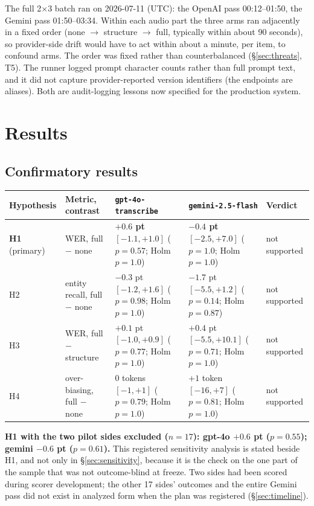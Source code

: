 \documentclass[11pt]{article}
\begin{document}
The full 2$\times$3 batch ran on 2026-07-11 (UTC): the OpenAI pass 00:12--01:50, the Gemini pass 01:50--03:34. Within each audio part the three arms ran adjacently in a fixed order (none $\rightarrow$ structure $\rightarrow$ full, typically within about 90 seconds), so provider-side drift would have to act within about a minute, per item, to confound arms. The order was fixed rather than counterbalanced (\S\ref{sec:threats}, T5). The runner logged prompt character counts rather than full prompt text, and it did not capture provider-reported version identifiers (the endpoints are aliases). Both are audit-logging lessons now specified for the production system.

\section{Results}
\label{sec:results}

\subsection{Confirmatory results}

\begin{center}
\begin{tabular}{@{}l p{2.5cm} p{4.3cm} p{4.3cm} l@{}}
\toprule
Hypothesis & Metric, contrast & \texttt{gpt-4o-transcribe} & \texttt{gemini-2.5-flash} & Verdict \\
\midrule
\textbf{H1} (primary) & WER, full $-$ none & \textbf{$+0.6$ pt} $[-1.1, +1.0]$ ($p = 0.57$; Holm $p = 1.0$) & \textbf{$-0.4$ pt} $[-2.5, +7.0]$ ($p = 1.0$; Holm $p = 1.0$) & not supported \\
\addlinespace
H2 & entity recall, full $-$ none & $-0.3$ pt $[-1.2, +1.6]$ ($p = 0.98$; Holm $p = 1.0$) & $-1.7$ pt $[-5.5, +1.2]$ ($p = 0.14$; Holm $p = 0.87$) & not supported \\
\addlinespace
H3 & WER, full $-$ structure & $+0.1$ pt $[-1.0, +0.9]$ ($p = 0.77$; Holm $p = 1.0$) & $+0.4$ pt $[-5.5, +10.1]$ ($p = 0.71$; Holm $p = 1.0$) & not supported \\
\addlinespace
H4 & over-biasing, full $-$ none & 0 tokens $[-1, +1]$ ($p = 0.79$; Holm $p = 1.0$) & $+1$ token $[-16, +7]$ ($p = 0.81$; Holm $p = 1.0$) & not supported \\
\bottomrule
\end{tabular}
\end{center}

\noindent\textbf{H1 with the two pilot sides excluded ($n = 17$): gpt-4o $+0.6$ pt ($p = 0.55$); gemini $-0.6$ pt ($p = 0.61$).} This registered sensitivity analysis is stated beside H1, and not only in \S\ref{sec:sensitivity}, because it is the check on the one part of the sample that was not outcome-blind at freeze. Two sides had been scored during scorer development; the other 17 sides' outcomes and the entire Gemini pass did not exist in analyzed form when the plan was registered (\S\ref{sec:timeline}).
\end{document}
